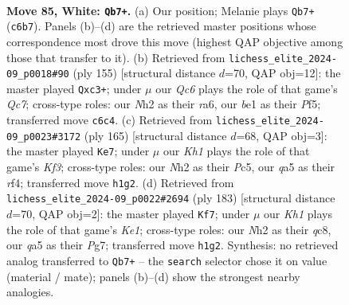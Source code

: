 \documentclass[11pt]{article}
\begin{document}
\clearpage

\begin{figure}[p]\centering
\begin{subfigure}{0.46\textwidth}\centering
\resizebox{\linewidth}{!}{%
\newchessgame
\chessboard[
  setfen={5r2/p3k1p1/2Q4r/q6P/3P4/4P3/7N/4b2K w - - 4 85},
  showmover=false,
  pgfstyle=straightmove, color=movearrow, markmove={c6-b7}
]}
\caption{}
\end{subfigure}\hfill
\begin{subfigure}{0.46\textwidth}\centering
\resizebox{\linewidth}{!}{%
\newchessgame
\chessboard[
  setfen={8/2k2p2/R4P2/5p2/8/2P1K3/p1q5/5Q2 b - - 19 78},
  showmover=false,
  pgfstyle=straightmove, color=movearrow, markmove={c2-c3}
]}
\caption{}
\end{subfigure}
\\[4pt]
\begin{subfigure}{0.46\textwidth}\centering
\resizebox{\linewidth}{!}{%
\newchessgame
\chessboard[
  setfen={8/8/4qk2/p1p5/P4R1p/7P/4B1P1/7K b - - 9 83},
  showmover=false,
  pgfstyle=straightmove, color=movearrow, markmove={f6-e7}
]}
\caption{}
\end{subfigure}\hfill
\begin{subfigure}{0.46\textwidth}\centering
\resizebox{\linewidth}{!}{%
\newchessgame
\chessboard[
  setfen={2Q1k3/6p1/4p3/3bP1p1/3R2P1/8/5q2/2K5 b - - 23 92},
  showmover=false,
  pgfstyle=straightmove, color=movearrow, markmove={e8-f7}
]}
\caption{}
\end{subfigure}
\caption{\textbf{Move 85, White: \texttt{Qb7+}.} (a) Our position; Melanie plays \texttt{Qb7+} (\texttt{c6b7}). Panels (b)--(d) are the retrieved master positions whose correspondence most drove this move (highest QAP objective among those that transfer to it). (b) Retrieved from \texttt{lichess\_elite\_2024-09\_p0018\#90} (ply 155) [structural distance $d$=70, QAP obj=12]: the master played \texttt{Qxc3+}; under $\mu$ our \emph{Qc6} plays the role of that game's \emph{Qc7}; cross-type roles: our \emph{N}h2 as their \emph{r}a6, our \emph{b}e1 as their \emph{P}f5; transferred move \texttt{c6c4}. (c) Retrieved from \texttt{lichess\_elite\_2024-09\_p0023\#3172} (ply 165) [structural distance $d$=68, QAP obj=3]: the master played \texttt{Ke7}; under $\mu$ our \emph{Kh1} plays the role of that game's \emph{Kf3}; cross-type roles: our \emph{N}h2 as their \emph{P}c5, our \emph{q}a5 as their \emph{r}f4; transferred move \texttt{h1g2}. (d) Retrieved from \texttt{lichess\_elite\_2024-09\_p0022\#2694} (ply 183) [structural distance $d$=70, QAP obj=2]: the master played \texttt{Kf7}; under $\mu$ our \emph{Kh1} plays the role of that game's \emph{Ke1}; cross-type roles: our \emph{N}h2 as their \emph{q}c8, our \emph{q}a5 as their \emph{P}g7; transferred move \texttt{h1g2}. Synthesis: no retrieved analog transferred to \texttt{Qb7+} -- the \texttt{search} selector chose it on value (material / mate); panels (b)--(d) show the strongest nearby analogies.}
\label{fig:thought-m168}
\end{figure}
\end{document}
